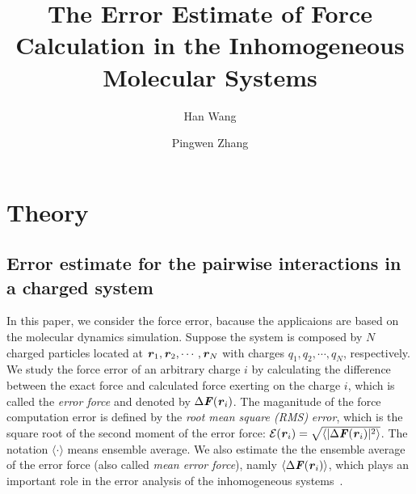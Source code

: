 \documentclass[aps,pre,preprint]{revtex4}
\renewcommand{\v}[1]{\textbf{\textit{#1}}}
\begin{document}
\title{The Error Estimate of Force Calculation in the Inhomogeneous Molecular Systems}
\author{Han Wang}
\author{Pingwen Zhang}

\begin{abstract}
\end{abstract}

\maketitle

\section{Theory}

\subsection{Error estimate for
  the pairwise interactions in a charged system}

In this paper, we consider the force error, bacause the applicaions
are based on the molecular dynamics simulation.  Suppose the system is
composed by $N$ charged particles located at $\v r_1, \v r_2, \cdots,
\v r_N$ with charges $q_1, q_2, \cdots, q_N$, respectively.  We study
the force error of an arbitrary charge $i$ by calculating the
difference between the exact force and calculated force exerting on
the charge $i$, which is called the \emph{error force}
\cite{wang2012} and denoted by $\Delta \v F(\v r_i)$.
The maganitude of the force computation error 
is defined by the \emph{root mean square (RMS)} \emph{error}, which is
the square root of the second moment of the error force: $\mathcal
E(\v r_i) = \sqrt{\langle\vert\Delta\v F(\v r_i)\vert^2\rangle}$.  The
notation $\langle\cdot\rangle$ means ensemble average.  We also
estimate the the ensemble average of the error force (also called
\emph{mean error force}), namly $\langle\Delta\v F(\v r_i)\rangle$,
which plays an important role in the error analysis of the
inhomogeneous systems~\cite{wang2012}.
\end{document}
